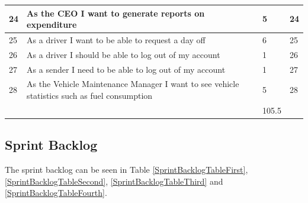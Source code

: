 \documentclass[paper=a4, fontsize=11pt]{scrartcl} %
\numberwithin{equation}{section} %
\numberwithin{figure}{section} %
\numberwithin{table}{section} %
\begin{document}
\begin{table}[!hbt]
\begin{tabular}{|p{1cm}|p{8cm}|p{2cm}|p{1.2cm}|}
24          & As the CEO I want to generate reports on expenditure                                                   & 5                 & 24                \\ \hline
25          & As a driver I want to be able to request a day off                                                     & 6                 & 25                \\ \hline
26          & As a driver I should be able to log out of my account                                                  & 1                 & 26                \\ \hline
27          & As a sender I need to be able to log out of my account                                                 & 1                 & 27                \\ \hline
28          & As the Vehicle Maintenance Manager I want to see vehicle statistics such as fuel consumption           & 5                 & 28                \\ \hline
            &                                                                                                        & 105.5             &                   \\ \hline
\end{tabular}
\end{table}

\subsection{Sprint Backlog}

The sprint backlog can be seen in Table \ref{SprintBacklogTableFirst}, \ref{SprintBacklogTableSecond}, \ref{SprintBacklogTableThird} and \ref{SprintBacklogTableFourth}.
\end{document}

